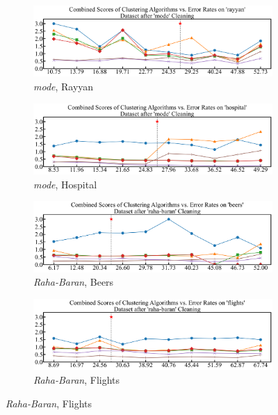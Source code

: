 \documentclass[10pt]{article} %
\numberwithin{equation}{section}
\begin{document}
\begin{figure}[H]
  \begin{subfigure}{0.48\linewidth}
    \centering
    \includegraphics[width=\linewidth]{figures/mode_rayyan_combined_scores.png}
    \caption{\textit{mode}, Rayyan}
    \label{fig:mode_rayyan}
  \end{subfigure}
  \hfill
  \begin{subfigure}{0.48\linewidth}
    \centering
    \includegraphics[width=\linewidth]{figures/mode_hospital_combined_scores.png}
    \caption{\textit{mode}, Hospital}
    \label{fig:mode_hospital}
  \end{subfigure}

  \vspace{0.2em} %

  \begin{subfigure}{0.48\linewidth}
    \centering
    \includegraphics[width=\linewidth]{figures/raha-baran_beers_combined_scores.png}
    \caption{\textit{Raha-Baran}, Beers}
    \label{fig:raha_baran_beers}
  \end{subfigure}
  \hfill
  \begin{subfigure}{0.48\linewidth}
    \centering
    \includegraphics[width=\linewidth]{figures/raha-baran_flights_combined_scores.png}
    \caption{\textit{Raha-Baran}, Flights}
    \label{fig:raha_baran_flights}
  \end{subfigure}


\end{figure}
\end{document}
